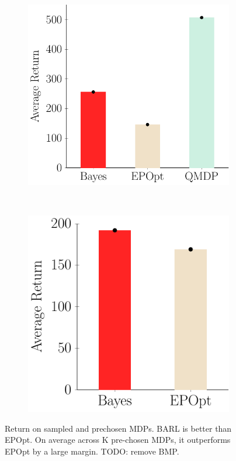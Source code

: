 \documentclass{article}
\begin{document}
\begin{figure}[t!]
\begin{centering}
\begin{subfigure}[b]{0.3\columnwidth}
\includegraphics[width=\linewidth]{figs/cheetah_env_comparison.pdf}
\end{subfigure}
~
\begin{subfigure}[b]{0.235\columnwidth}
\includegraphics[width=\linewidth]{figs/cheetah_average.pdf}
\end{subfigure}
\caption{Return on sampled and prechosen MDPs. BARL is better than EPOpt. On average across K pre-chosen MDPs, it outperforms EPOpt by a large margin. TODO: remove BMP.}
\end{centering}
\end{figure}
\end{document}
